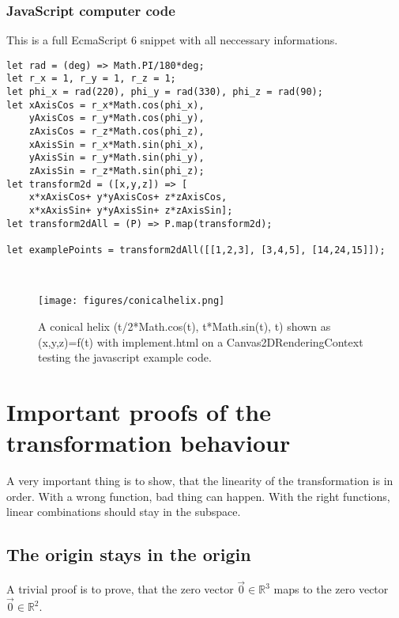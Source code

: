 \documentclass[a4paper]{article}
\begin{document}
\subsubsection{JavaScript computer code}
\begin{example}
This is a full EcmaScript 6 snippet with all neccessary informations.\\
\begin{lstlisting}
let rad = (deg) => Math.PI/180*deg;
let r_x = 1, r_y = 1, r_z = 1; 
let phi_x = rad(220), phi_y = rad(330), phi_z = rad(90); 
let xAxisCos = r_x*Math.cos(phi_x), 
    yAxisCos = r_y*Math.cos(phi_y),
    zAxisCos = r_z*Math.cos(phi_z),
    xAxisSin = r_x*Math.sin(phi_x), 
    yAxisSin = r_y*Math.sin(phi_y),
    zAxisSin = r_z*Math.sin(phi_z);
let transform2d = ([x,y,z]) => [
    x*xAxisCos+ y*yAxisCos+ z*zAxisCos,
    x*xAxisSin+ y*yAxisSin+ z*zAxisSin];
let transform2dAll = (P) => P.map(transform2d);

let examplePoints = transform2dAll([[1,2,3], [3,4,5], [14,24,15]]);
\end{lstlisting}
\end{example}\\

\begin{figure}[ht]
\texttt{[image: figures/conicalhelix.png]}
\caption{A conical helix (t/2*Math.cos(t), t*Math.sin(t), t) shown as (x,y,z)=f(t) with implement.html on a Canvas2DRenderingContext testing the javascript example code.}
\end{figure}

\section{Important proofs of the transformation behaviour}
\label{important_proofs}

A very important thing is to show, that the linearity of the transformation is in order. With a wrong function, bad thing can happen.
With the right functions, linear combinations should stay in the subspace.

\subsection{The origin stays in the origin}

A trivial proof is to prove, that the zero vector $\vec{0} \in \mathbb{R}^3$ maps to the zero vector $\vec{0} \in \mathbb{R}^2$.\\
\end{document}
